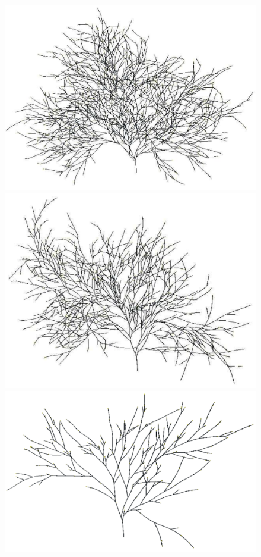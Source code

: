 \begin{figure}
\includegraphics[scale=0.15]{auvaursi-sandpit-15-35d-30cm}
\includegraphics[scale=0.15]{auvaursi-sandpit-15-45d-30cm}
\includegraphics[scale=0.15]{auvaursi-sandpit-15-65d-30cm}

\end{figure}
